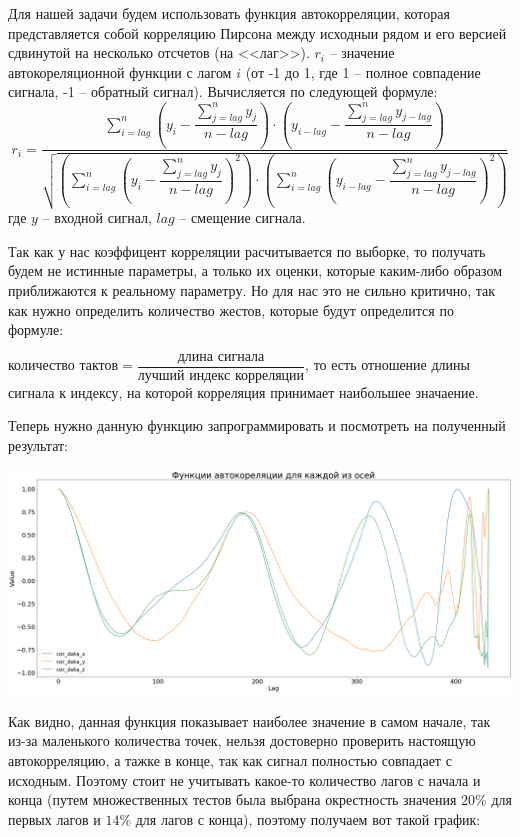\documentclass[a4paper]{article}
\begin{document}
Для нашей задачи будем использовать функция автокорреляции, которая представляется собой корреляцию Пирсона между исходныи рядом и его версией сдвинутой на несколько отсчетов (на <<лаг>>). $r_i$ -- значение автокореляционной функции с лагом $i$ (от -1 до 1, где 1 -- полное совпадение сигнала, -1 -- обратный сигнал). Вычисляется по следующей формуле:
\[r_i = \dfrac{\sum_{i = lag}^n \left(y_i - \dfrac{\sum_{j = lag}^n y_j}{n - lag} \right) \cdot \left(y_{i-lag} - \dfrac{\sum_{j = lag}^n y_{j - lag}}{n - lag} \right)}{\sqrt{ \left( \sum_{i = lag}^n \left(y_i - \dfrac{\sum_{j = lag}^n y_j}{n - lag} \right)^2 \right) \cdot \left( \sum_{i = lag}^n \left(y_{i - lag} - \dfrac{\sum_{j = lag}^n y_{j-lag}}{n - lag} \right)^2 \right) }}\]
где $y$ -- входной сигнал, $lag$ -- смещение сигнала.

Так как у нас коэффицент корреляции расчитывается по выборке, то получать будем не истинные параметры, а только их оценки, которые каким-либо образом приближаются к реальному параметру. Но для нас это не сильно критично, так как нужно определить количество жестов, которые будут определится по формуле:

$\text{количество тактов} = \dfrac{\text{длина сигнала}}{\text{лучший индекс корреляции}}$, то есть отношение длины сигнала к индексу, на которой корреляция принимает наибольшее значаение.

Теперь нужно данную функцию запрограммировать и посмотреть на полученный результат:

\includegraphics[scale = 0.17]{cor_data_x_y_z_with_no_delta.png}

Как видно, данная функция показывает наиболее значение в самом начале, так из-за маленького количества точек, нельзя достоверно проверить настоящую автокорреляцию, а тажке в конце, так как сигнал полностью совпадает с исходным.
Поэтому стоит не учитывать какое-то количество лагов с начала и конца (путем множественных тестов была выбрана окрестность значения $20 \%$ для первых лагов и $14 \%$ для лагов с конца), поэтому получаем вот такой график:
\end{document}
